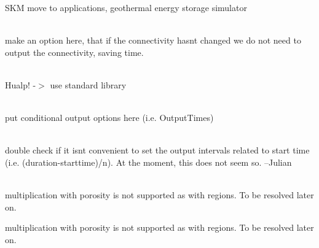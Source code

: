 \begin{DoxyRefList}
\label{todo__todo000204}%
%
SKM move to applications, geothermal energy storage simulator 
\item[Member \doxylink{classcsmp_1_1_simulator_control_a28370d4a5540a0a5b46504f29d938d4e}{csmp\+::Simulator\+Control\texorpdfstring{$<$}{<} dim \texorpdfstring{$>$}{>}\+::Output\+Restart\+File} (bool manually\+\_\+triggered=false)]\hfill \\
\label{todo__todo000199}%
%
make an option here, that if the connectivity hasn\textquotesingle{}t changed we do not need to output the connectivity, saving time.  
\item[Member \doxylink{classcsmp_1_1_simulator_control_a7f972b43b062427590948e12be605d57}{csmp\+::Simulator\+Control\texorpdfstring{$<$}{<} dim \texorpdfstring{$>$}{>}\+::Output\+Simulation\+Time\+To\+Screen} (double time)]\hfill \\
\label{todo__todo000202}%
%
Hualp! -\/\texorpdfstring{$>$}{>} use standard library 
\item[Member \doxylink{classcsmp_1_1_simulator_control_a402cc82f57a173d1b72515d1351c4fa2}{csmp\+::Simulator\+Control\texorpdfstring{$<$}{<} dim \texorpdfstring{$>$}{>}\+::Output\+Variable\+To\+Region\+VTUFiles} ()]\hfill \\
\label{todo__todo000200}%
%
put conditional output options here (i.\+e. Output\+Times)  
\item[Member \doxylink{classcsmp_1_1_simulator_control_a46cad531b8ee01b13539fa496ab1b60b}{csmp\+::Simulator\+Control\texorpdfstring{$<$}{<} dim \texorpdfstring{$>$}{>}\+::Set\+Output\+Times} (size\+\_\+t n, double starttime=0.\+0)]\hfill \\
\label{todo__todo000201}%
%
double check if it isn\textquotesingle{}t convenient to set the output intervals related to start time (i.\+e. (duration-\/starttime)/n). At the moment, this does not seem so. --Julian  
\item[Member \doxylink{classcsmp_1_1_simulator_monitor_ab3a685d2d6ec5994ef8be5fb1677d849}{csmp\+::Simulator\+Monitor\texorpdfstring{$<$}{<} dim \texorpdfstring{$>$}{>}\+::Calculate\+Dimensions\+And\+Perimeters} (std\+::vector$<$ double $>$ \&rowdata)]\hfill \\
\label{todo__todo000206}%
%
multiplication with porosity is not supported as with regions. To be resolved later on. 

\label{todo__todo000207}%
%
multiplication with porosity is not supported as with regions. To be resolved later on. 


\end{DoxyRefList}
